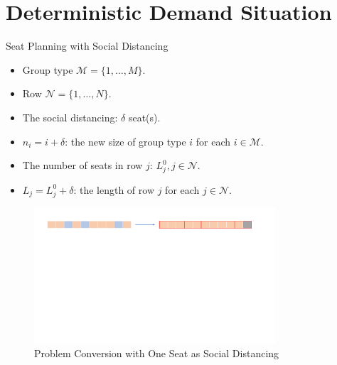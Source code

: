 
\section{Deterministic Demand Situation}
    \frame{\sectionpage}

    \begin{frame}{Seat Planning with Social Distancing}
      \begin{itemize}
      \item Group type $\mathcal{M} = \{1, \ldots, M\}$.
      \item Row $\mathcal{N} = \{1, \ldots, N\}$.
      \item The social distancing: $\delta$ seat(s).
      \item $n_i = i + \delta$: the new size of group type $i$ for each $i \in \mathcal{M}$.
      \item The number of seats in row $j$: $L_j^{0}, j \in \mathcal{N}$.
      \item $L_j = L_j^{0} + \delta$: the length of row $j$ for each $j \in \mathcal{N}$.
      \end{itemize}
      
      \begin{figure}[ht]
        \centering
        \includegraphics[width = 0.8\textwidth]{./images/dummy_seat.pdf}
        \caption{Problem Conversion with One Seat as Social Distancing}
    \end{figure}
    \end{frame}

